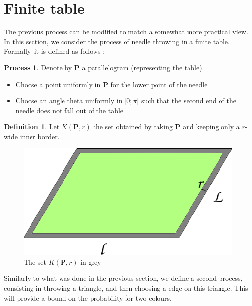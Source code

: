 \documentclass[a4paper,11pt]{article}
\theoremstyle{definition}
\newtheorem{definition}{Definition}
\newtheorem{process}{Process}
\theoremstyle{remark}
\begin{document}
\section{Finite table} \label{fini}

The previous process can be modified to match a somewhat more practical view. 
In this section, we consider the process of needle throwing in a finite table. 
Formally, it is defined as follows :


\begin{process}
Denote by $\mathbf{P}$ a parallelogram (representing the table). 
\begin{itemize}
\item Choose a point uniformly in $\mathbf{P}$ for the lower point of the needle
\item Choose an angle theta uniformly in $[0 ; \pi[$ such that the second end 
of the needle does not fall out of the table
\end{itemize}
\end{process}

\begin{definition}
Let $K(\mathbf{P},r)$ the set obtained by taking $\mathbf{P}$ 
and keeping only a $r$-wide inner border.
\end{definition}

\begin{figure}[h]
\center
\includegraphics[scale=0.5]{tablefinie.png}
\caption{\label{tablefinie} The set $K(\mathbf{P},r)$ in grey}
\end{figure}

Similarly to what was done in the previous section, we define a second process, 
consisting in throwing a triangle, and then choosing a edge on this triangle.
This will provide a bound on the probability for two colours.
\end{document}
